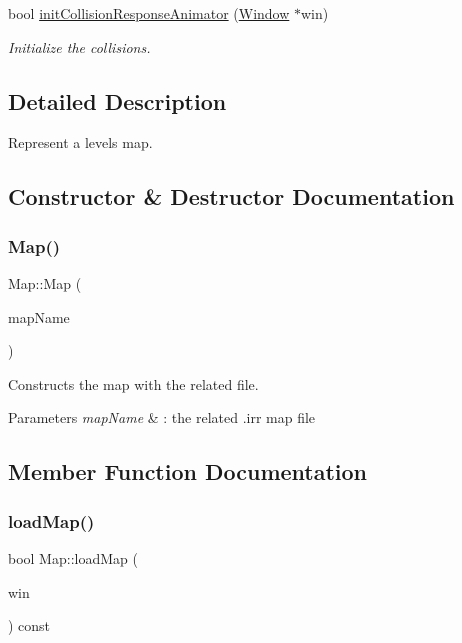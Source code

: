 \begin{DoxyCompactItemize}
\mbox{\label{classMap_a32036203973ef41327f3f0616a30550f}} 
bool \hyperlink{classMap_a32036203973ef41327f3f0616a30550f}{init\+Collision\+Response\+Animator} (\hyperlink{classWindow}{Window} $\ast$win)
\begin{DoxyCompactList}\small\item\em Initialize the collisions. \end{DoxyCompactList}\end{DoxyCompactItemize}


\subsection{Detailed Description}
Represent a level\textquotesingle{}s map. 

\subsection{Constructor \& Destructor Documentation}
\mbox{\label{classMap_a2e6d2bce865999917deae256baaa434d}} 
\subsubsection{\texorpdfstring{Map()}{Map()}}
{\footnotesize\ttfamily Map\+::\+Map (\begin{DoxyParamCaption}\item[{W\+String const}]{map\+Name }\end{DoxyParamCaption})}



Constructs the map with the related file. 


\begin{DoxyParams}{Parameters}
{\em map\+Name} & \+: the related .irr map file \\
\hline
\end{DoxyParams}


\subsection{Member Function Documentation}
\mbox{\label{classMap_a37024e6d47ca10cf83a331635fe041b7}} 
\subsubsection{\texorpdfstring{load\+Map()}{loadMap()}}
{\footnotesize\ttfamily bool Map\+::load\+Map (\begin{DoxyParamCaption}\item[{\hyperlink{classWindow}{Window} $\ast$}]{win }\end{DoxyParamCaption}) const}



